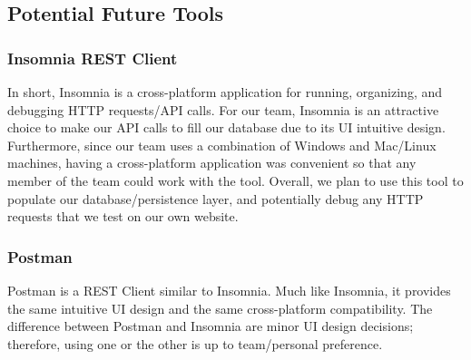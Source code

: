 \documentclass{scrartcl}
\begin{document}
\subsection{Potential Future Tools}
\subsubsection{Insomnia REST Client}
In short, Insomnia is a cross-platform application for running, organizing, and debugging HTTP requests/API calls. For our team, Insomnia is an attractive choice to make our API calls to fill our database due to its UI intuitive design. Furthermore, since our team uses a combination of Windows and Mac/Linux machines, having a cross-platform application was convenient so that any member of the team could work with the tool. Overall, we plan to use this tool to populate our database/persistence layer, and potentially debug any HTTP requests that we test on our own website.

\subsubsection{Postman}
Postman is a REST Client similar to Insomnia. Much like Insomnia, it provides the same intuitive UI design and the same cross-platform compatibility. The difference between Postman and Insomnia are minor UI design decisions; therefore, using one or the other is up to team/personal preference.
\end{document}
